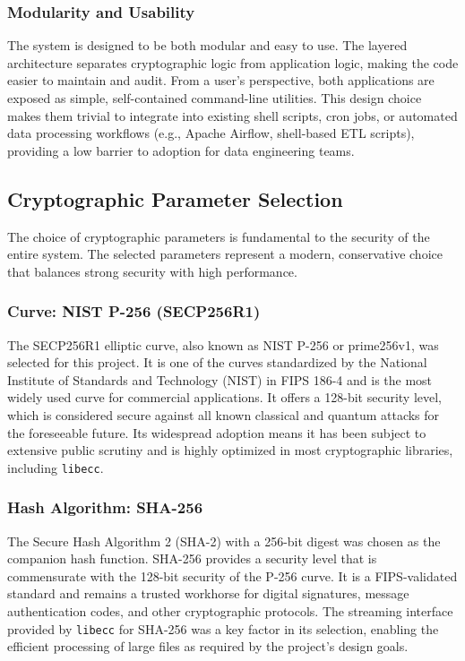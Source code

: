 \documentclass[12pt, letterpaper]{article}
\begin{document}
\subsubsection{Modularity and Usability}
The system is designed to be both modular and easy to use. The layered architecture separates cryptographic logic from application logic, making the code easier to maintain and audit. From a user's perspective, both applications are exposed as simple, self-contained command-line utilities. This design choice makes them trivial to integrate into existing shell scripts, cron jobs, or automated data processing workflows (e.g., Apache Airflow, shell-based ETL scripts), providing a low barrier to adoption for data engineering teams.

\subsection{Cryptographic Parameter Selection}
The choice of cryptographic parameters is fundamental to the security of the entire system. The selected parameters represent a modern, conservative choice that balances strong security with high performance.

\subsubsection{Curve: NIST P-256 (SECP256R1)}
The SECP256R1 elliptic curve, also known as NIST P-256 or prime256v1, was selected for this project. It is one of the curves standardized by the National Institute of Standards and Technology (NIST) in FIPS 186-4 and is the most widely used curve for commercial applications. It offers a 128-bit security level, which is considered secure against all known classical and quantum attacks for the foreseeable future. Its widespread adoption means it has been subject to extensive public scrutiny and is highly optimized in most cryptographic libraries, including \texttt{libecc}.

\subsubsection{Hash Algorithm: SHA-256}
The Secure Hash Algorithm 2 (SHA-2) with a 256-bit digest was chosen as the companion hash function. SHA-256 provides a security level that is commensurate with the 128-bit security of the P-256 curve. It is a FIPS-validated standard and remains a trusted workhorse for digital signatures, message authentication codes, and other cryptographic protocols. The streaming interface provided by \texttt{libecc} for SHA-256 was a key factor in its selection, enabling the efficient processing of large files as required by the project's design goals.
\end{document}
